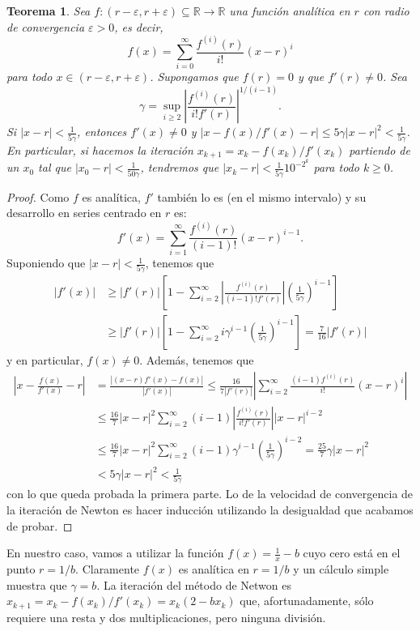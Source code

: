 \documentclass[a4paper, 11pt]{article}
\newcommand{\RR}{\mathbb{R}}
\newcounter{numerodetema}
\theoremstyle{plain}
\newtheorem{teor}{Teorema}[numerodetema]
\theoremstyle{definition}
\begin{document}
\begin{teor}
Sea $f:(r-\varepsilon,r+\varepsilon)\subseteq\RR\to\RR$ una función
analítica en $r$ con radio de convergencia $\varepsilon>0$, es decir,
\[
   f(x)=\sum_{i=0}^\infty\frac{f^{(i)}(r)}{i!}(x-r)^i
\]
para todo $x\in (r-\varepsilon,r+\varepsilon)$. Supongamos que $f(r)=0$
y que $f'(r)\neq 0$. Sea
\[
  \gamma=\sup_{i\geq 2}\left|\frac{f^{(i)}(r)}{i!f'(r)}\right|^{1/(i-1)}.
\]
Si $|x-r|<\frac{1}{5\gamma}$, entonces $f'(x)\neq 0$ y
$|x-f(x)/f'(x)-r|\leq 5\gamma|x-r|^2<\frac{1}{5\gamma}$. En particular, si
hacemos la iteración $x_{k+1}=x_{k}-f(x_k)/f'(x_k)$ partiendo de un $x_0$ tal
que $|x_0-r|<\frac{1}{50\gamma}$, tendremos que
$|x_k-r|<\frac{1}{5\gamma}10^{-2^k}$ para todo $k\geq 0$.
\end{teor}
\begin{proof}
Como $f$ es analítica, $f'$ también lo es (en el mismo intervalo) y su
desarrollo en series centrado en $r$ es:
\[
   f'(x)=\sum_{i=1}^\infty\frac{f^{(i)}(r)}{(i-1)!}(x-r)^{i-1}.
\]
Suponiendo que $|x-r|<\frac1{5\gamma}$, tenemos que
\[
\begin{aligned}
  |f'(x)| &\geq |f'(r)|\left[
     1-\sum_{i=2}^\infty\left|\frac{f^{(i)}(r)}{(i-1)!f'(r)}\right|
     \left(\frac1{5\gamma}\right)^{i-1}
  \right] \\
  &\geq |f'(r)|\left[
     1-\sum_{i=2}^\infty i\gamma^{i-1}\left(\frac1{5\gamma}\right)^{i-1}
  \right] = \frac7{16}|f'(r)|
\end{aligned}
\]
y en particular, $f(x)\neq 0$. Además, tenemos que
\[
\begin{aligned}
\left|x-\frac{f(x)}{f'(x)}-r\right| &= \frac{|(x-r)f'(x)-f(x)|}{|f'(x)|}
\leq \frac{16}{7|f'(r)|}\left|\sum_{i=2}^\infty \frac{(i-1)f^{(i)}(r)}{i!}(x-r)^i\right| \\
&\leq \frac{16}7|x-r|^2\sum_{i=2}^\infty(i-1)\left|\frac{f^{(i)}(r)}{i!f'(r)}\right||x-r|^{i-2} \\
&\leq\frac{16}7|x-r|^2\sum_{i=2}^\infty(i-1)\gamma^{i-1}\left(\frac1{5\gamma}\right)^{i-2}=\frac{25}7\gamma|x-r|^2 \\
& <5\gamma|x-r|^2<\frac1{5\gamma}
\end{aligned}
\]
con lo que queda probada la primera parte. Lo de la velocidad de convergencia
de la iteración de Newton es hacer inducción utilizando la desigualdad que
acabamos de probar.
\end{proof}

En nuestro caso, vamos a utilizar la función $f(x)=\frac{1}{x}-b$ cuyo cero
está en el punto $r=1/b$. Claramente $f(x)$ es analítica en $r=1/b$  y un
cálculo simple muestra que $\gamma=b$. La iteración del método de Netwon
es $x_{k+1}=x_k-f(x_k)/f'(x_k)=x_k(2-bx_k)$ que, afortunadamente, sólo
requiere una resta y dos multiplicaciones, pero ninguna división.
\end{document}
